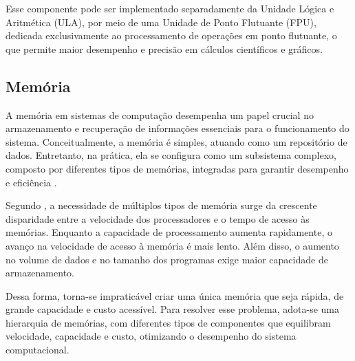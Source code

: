 \documentclass[
	12pt,				%
	openright,			%
	oneside,			%
	a4paper,			%
	english,			%
	french,				%
	spanish,			%
	brazil,				%
	]{abntex2}
\begin{document}
Esse componente pode ser implementado separadamente da Unidade Lógica e Aritmética (ULA), por meio de uma Unidade de Ponto Flutuante (FPU), dedicada exclusivamente ao processamento de operações em ponto flutuante, o que permite maior desempenho e precisão em cálculos científicos e gráficos.

\subsection{Memória}\label{sec:memoria}
A memória em sistemas de computação desempenha um papel crucial no armazenamento e recuperação de informações essenciais para o funcionamento do sistema. Conceitualmente, a memória é simples, atuando como um repositório de dados. Entretanto, na prática, ela se configura como um subsistema complexo, composto por diferentes tipos de memórias, integradas para garantir desempenho e eficiência \cite[p.79]{monteiro_introducao_2007}.

Segundo , a necessidade de múltiplos tipos de memória surge da crescente disparidade entre a velocidade dos processadores e o tempo de acesso às memórias. Enquanto a capacidade de processamento aumenta rapidamente, o avanço na velocidade de acesso à memória é mais lento. Além disso, o aumento no volume de dados e no tamanho dos programas exige maior capacidade de armazenamento.

Dessa forma, torna-se impraticável criar uma única memória que seja rápida, de grande capacidade e custo acessível. Para resolver esse problema, adota-se uma hierarquia de memórias, com diferentes tipos de componentes que equilibram velocidade, capacidade e custo, otimizando o desempenho do sistema computacional.
\end{document}
